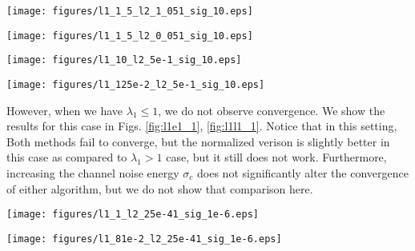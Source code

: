 \documentclass[10pt]{article}
\begin{document}
\begin{minipage}[t]{.5\linewidth}
\centering
\texttt{[image: figures/l1\_1\_5\_l2\_1\_051\_sig\_10.eps]}
\label{fig:chk_r1}
\end{minipage}%
\begin{minipage}[t]{.5\linewidth}
\centering
\texttt{[image: figures/l1\_1\_5\_l2\_0\_051\_sig\_10.eps]}
\label{fig:chk_r2}
\end{minipage}


\begin{minipage}[t]{.5\linewidth}
\centering
\texttt{[image: figures/l1\_10\_l2\_5e-1\_sig\_10.eps]}
\label{fig:l1g1_1}
\end{minipage}%
\begin{minipage}[t]{.5\linewidth}
\centering
\texttt{[image: figures/l1\_125e-2\_l2\_5e-1\_sig\_10.eps]}
\label{fig:l1g1_2}
\end{minipage}

However, when we have $\lambda_1 \leq 1$, we do not observe convergence. We show the results for this case in Figs. \ref{fig:l1e1_1}, \ref{fig:l1l1_1}. Notice that in this setting, Both methods fail to converge, but the normalized verison is slightly better in this case as compared to $\lambda_1 > 1$ case, but it still does not work. Furthermore, increasing the channel noise energy $\sigma_c$ does not significantly alter the convergence of either algorithm, but we do not show that comparison here. 

\begin{minipage}[t]{.5\linewidth}
\centering
\texttt{[image: figures/l1\_1\_l2\_25e-41\_sig\_1e-6.eps]}
\label{fig:l1e1_1}
\end{minipage}%
\begin{minipage}[t]{.5\linewidth}
\centering
\texttt{[image: figures/l1\_81e-2\_l2\_25e-41\_sig\_1e-6.eps]}
\label{fig:l1l1_1}
\end{minipage}
\end{document}
